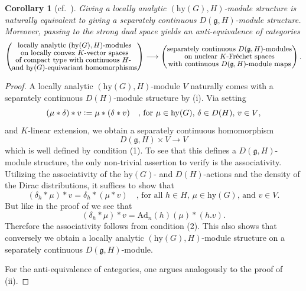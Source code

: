 \documentclass[a4paper, reqno, 10pt]{amsart}
\newtheorem{corollary}[theorem]{Corollary}
\theoremstyle{definition}
\numberwithin{equation}{section}
\newcommand{\Ad}{{\mathrm{Ad}}}
\newcommand{\defeq}{\vcentcolon=}
\newcommand{\hy}{{\mathrm{hy}}}
\newcommand{\lra}{\longrightarrow}
\newcommand{\Fg}{{\mathfrak {g}}}
\begin{document}
\begin{corollary}[{cf.\ \cite[Lemma 7.4.2]{AgrawalStrauch22FromCatOLocAnRep}}]\label{Cor 1 - Equivalence between compatible hyperalgebra modules and modules over product of hyperalgebra and distribution algebra of subgroup}
	Giving a locally analytic $(\hy(G),H)$-module structure is naturally equivalent to giving a separately continuous $D(\Fg,H)$-module structure. 
	Moreover, passing to the strong dual space yields an anti-equivalence of categories
	\begin{equation*}
		\left(\substack{\text{\small locally analytic $(\hy(G),H)$-modules} \\ \text{\small on locally convex $K$-vector spaces}\\ \text{\small of compact type with continuous $H$- } \\ \text{\small and $\hy(G)$-equivariant homomorphisms}}\right) \lra \left(\substack{\text{\small separately continuous $D(\Fg,H)$-modules} \\ \text{\small on nuclear $K$-Fr\'echet spaces} \\ \text{\small with continuous $D(\Fg,H)$-module maps}}\right) .
	\end{equation*}
\end{corollary}
\begin{proof}
	A locally analytic $(\hy(G),H)$-module $V$ naturally comes with a separately continuous $D(H)$-module structure by  (i).
	Via setting
	\begin{equation*}
		(\mu \ast \delta) \ast v \defeq \mu \ast (\delta \ast v) \quad\text{, for $\mu \in \hy(G)$, $\delta \in D(H)$, $v\in V$,}
	\end{equation*}	
	and $K$-linear extension, we obtain a separately continuous homomorphism
	\begin{equation*}
		D(\Fg,H) \times V \lra V
	\end{equation*}
	which is well defined by condition (1).
	To see that this defines a $D(\Fg,H)$-module structure, the only non-trivial assertion to verify is the associativity.
	Utilizing the associativity of the $\hy(G)$- and $D(H)$-actions and the density of the Dirac distributions, it suffices to show that
	\begin{equation*}
		(\delta_h \ast \mu) \ast v = \delta_h \ast (\mu \ast v) \quad\text{, for all $h\in H$, $\mu \in \hy(G)$, and $v\in V$.}
	\end{equation*}
	But like in the proof of  we see that
	\begin{equation*}
		(\delta_h \ast \mu) \ast v =  \Ad_n(h)(\mu) \ast (h.v) .
	\end{equation*}
	Therefore the associativity follows from condition (2).
	This also shows that conversely we obtain a locally analytic $(\hy(G),H)$-module structure on a separately continuous $D(\Fg,H)$-module.
	
	
	For the anti-equivalence of categories, one argues analogously to the proof of  (ii).
\end{proof}
\end{document}
